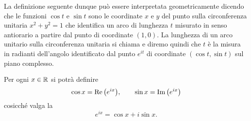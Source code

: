 La definizione seguente dunque può essere interpretata geometricamente 
dicendo che le funzioni $\cos t$ e $\sin t$ sono le coordinate 
$x$ e $y$ del punto sulla circonferenza unitaria $x^2+y^2=1$ 
che identifica un arco di lunghezza $t$ misurato in senso antiorario 
a partire dal punto di coordinate $(1,0)$. 
La lunghezza di un arco unitario sulla circonferenza unitaria 
si chiama  e diremo quindi che $t$
è la misura in radianti dell'angolo identificato dal punto $e^{it}$
di coordinate $(\cos t, \sin t)$ sul piano complesso.


\begin{definition}%
\label{def:sincos}%
\index{$\cos$}%
\index{$\sin$}%
%
%
%
Per ogni $x\in {\mathbb R}$ si potrà definire
\[
  \cos x = \operatorname{Re} {\left( e^{ix} \right)}, \qquad
  \sin x = \operatorname{Im} {\left( e^{ix} \right)}
\]
cosicché valga la
%
\mymark{***}%
\[
  e^{ix} = \cos x + i \sin x.
\]
\end{definition}

